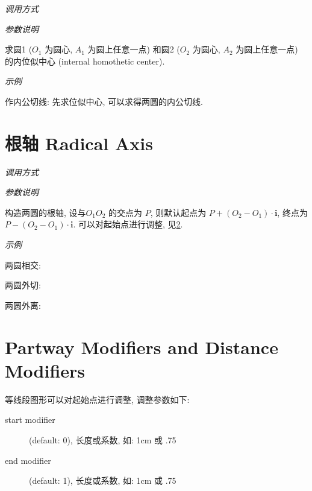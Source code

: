 \emph{调用方式}

\begin{tcolorbox}{}
\end{tcolorbox}

\emph{参数说明}

求圆1 ($O_1$ 为圆心, $A_1$ 为圆上任意一点)
和圆2 ($O_2$ 为圆心, $A_2$ 为圆上任意一点) 
的内位似中心 (internal homothetic center)\cite{HOMO}.

\emph{示例}

作内公切线: 先求位似中心, 可以求得两圆的内公切线.


\section{根轴 Radical Axis}

\emph{调用方式}

\begin{tcolorbox}{}
\end{tcolorbox}

\emph{参数说明}

构造两圆的根轴, 设与$O_1O_2$ 的交点为 $P$, 则默认起点为 $P+(O_2-O_1) \cdot \mathbf{i}$, 终点为 $P-(O_2-O_1) \cdot \mathbf{i}$.
可以对起始点进行调整, 见\ref{sec:modifiers}.

\emph{示例}

两圆相交:


两圆外切:


两圆外离:


\section{Partway Modifiers and Distance Modifiers}\label{sec:modifiers}

等线段图形可以对起始点进行调整, 调整参数如下\cite{CALC}:

\begin{description}
  \item[start modifier] (default: 0), 长度或系数, 如: 1cm 或 .75
  \item[end modifier] (default: 1), 长度或系数, 如: 1cm 或 .75
\end{description}

